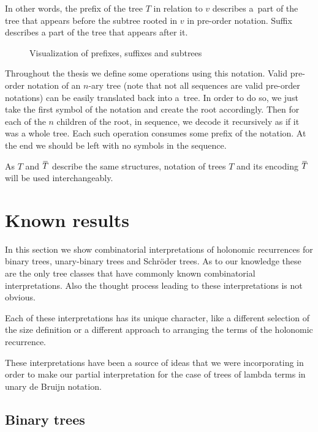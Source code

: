 \documentclass[final]{article}
\theoremstyle{definition}
\theoremstyle{definition}
\theoremstyle{remark}
\newcommand{\ols}[1]{\mskip.5\thinmuskip\overline{\mskip-.5\thinmuskip {#1} \mskip-.5\thinmuskip}\mskip.5\thinmuskip} %
\newcommand{\enc}[1]{\ensuremath{\ols{#1}}}
\begin{document}
In other words, the prefix of the tree \(T\) in relation to \(v\) describes a~part of the tree that appears before the subtree rooted in \(v\) in pre-order notation. Suffix describes a part of the tree that appears after it.

\begin{figure}[H]
    \centering
    
    \caption{Visualization of prefixes, suffixes and subtrees}%
    \label{fig:presuf}
\end{figure}

Throughout the thesis we define some operations using this notation. Valid pre-order notation of an \(n\)-ary tree (note that not all sequences are valid pre-order notations) can be easily translated back into a~tree. In order to do so, we just take the first symbol of the notation and create the root accordingly. Then for each of the \(n\) children of the root, in sequence, we decode it recursively as if it was a whole tree. Each such operation consumes some prefix of the notation. At the end we should be left with no symbols in the sequence.

As \(T\) and \(\enc{T}\) describe the same structures, notation of trees \(T\) and its encoding \(\enc{T}\) will be used interchangeably.

\section{Known results}%
\label{sec:known_results}

In this section we show combinatorial interpretations of holonomic recurrences for binary trees, unary-binary trees and Schröder trees. As to our knowledge these are the only tree classes that have commonly known combinatorial interpretations. Also the thought process leading to these interpretations is not obvious.

Each of these interpretations has its unique character, like a different selection of the size definition or a different approach to arranging the terms of the holonomic recurrence.

These interpretations have been a source of ideas that we were incorporating in order to make our partial interpretation for the case of trees of lambda terms in unary de Bruijn notation.

\subsection{Binary trees}%
\label{sub:binary_trees}
\end{document}
